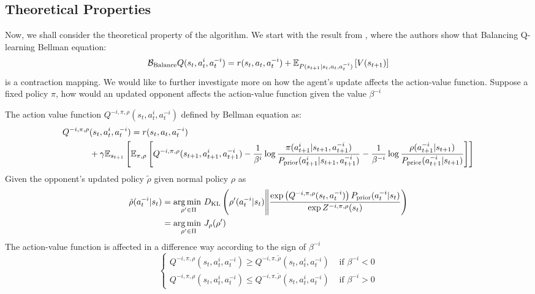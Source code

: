 \subsection{Theoretical Properties}
\label{sec:chap3-balancing-Q-theoretical}
Now, we shall consider the theoretical property of the algorithm. We start with the result from \cite{grau2018balancing}, where the authors show that Balancing Q-learning Bellman equation:
\begin{equation}
    \mathcal{B}_{\text{Balance}} Q(s_t, a^i_t, a^{-i}_t) = r(s_t, a_t, a^{-i}_t) + \mathbb{E}_{P(s_{t+1} | s_t, a_t, a^{-i}_t)}\left[ V(s_{t+1}) \right]
\end{equation}
is a contraction mapping. We would like to further investigate more on how the agent's update affects the action-value function. Suppose a fixed policy $\pi$, how would an updated opponent affects the action-value function given the value $\beta^{-i}$
\begin{theorem}
\label{thm:update-balance-opponent}
    The action value function $Q^{-i, \pi, \rho}(s_t, a^i_t, a^{-i}_t)$ defined by Bellman equation as:
    \begin{equation}
    \begin{aligned}
        Q^{-i, \pi, \rho}&(s_t, a^i_t, a^{-i}_t) = r(s_t, a_t, a^{-i}_t) \\
        &+ \gamma\mathbb{E}_{s_{t+1}}\left[ \mathbb{E}_{\pi, \rho}\left[ Q^{-i, \pi, \rho}(s_{t+1}, a^i_{t+1}, a^{-i}_{t+1}) - \frac{1}{\beta^i} \log\frac{\pi(a^i_{t+1}|s_{t+1}, a^{-i}_{t+1})}{P_{\text{prior}}(a^i_{t+1}|s_{t+1}, a^{-i}_{t+1})} - \frac{1}{\beta^{-i}}\log \frac{\rho(a^{-i}_{t+1}|s_{t+1})}{P_{\text{prior}}(a^{-i}_{t+1}|s_{t+1})} \right] \right]
    \end{aligned}
    \end{equation}
    Given the opponent's updated policy $\tilde{\rho}$ given normal policy $\rho$ as 
    \begin{equation}
    \begin{aligned}
        \tilde{\rho}(a^{-i}_t | s_t) &= \underset{\rho' \in \Pi}{\arg\min \ } D_{\mathrm{KL}} \left(  \rho'(a^{-i}_t | s_t) \Bigg\| \frac{\exp\left( Q^{-i, \pi, \rho}(s_t, a^{-i}_t) \right) P_{\text{prior}}(a^{-i}_t | s_t)}{\exp Z^{-i, \pi, \rho}(s_t)} \right) \\
        &=\underset{\rho' \in \Pi}{\arg\min \ } J_{\rho}(\rho')
    \end{aligned}
    \end{equation}
    The action-value function is affected in a difference way according to the sign of $\beta^{-i}$
    \begin{equation}
    \begin{cases}
        Q^{-i, \pi, \rho}(s_t, a^i_t, a^{-i}_t) \ge Q^{-i, \pi, \tilde{\rho}}(s_t, a^i_t, a^{-i}_t) &\text{ if } \beta^{-i} < 0 \\
        Q^{-i, \pi, \rho}(s_t, a^i_t, a^{-i}_t) \le Q^{-i, \pi, \tilde{\rho}}(s_t, a^i_t, a^{-i}_t)&\text{ if } \beta^{-i} > 0
    \end{cases}
    \end{equation}
\end{theorem}

